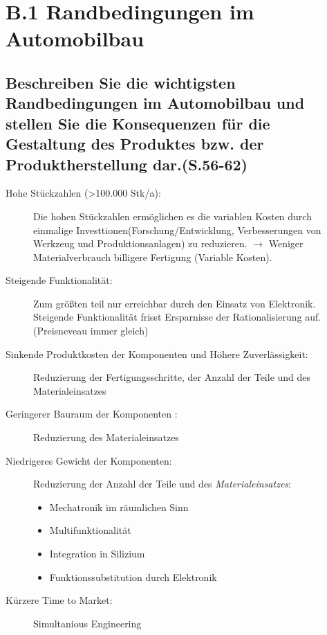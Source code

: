 \section*{B.1 Randbedingungen im Automobilbau}

\subsection{Beschreiben Sie die wichtigsten Randbedingungen im Automobilbau und stellen Sie die Konsequenzen f\"ur die Gestaltung des Produktes bzw. der Produktherstellung dar.(S.56-62)}
\begin{description}
  \item[Hohe Stückzahlen (\textgreater 100.000 Stk/a):]
    Die hohen Stückzahlen ermöglichen es die variablen Kosten durch
    einmalige Investtionen(Forschung/Entwicklung, Verbesserungen von
    Werkzeug und Produktionsanlagen) zu reduzieren. $\rightarrow$
    Weniger Materialverbrauch billigere Fertigung (Variable Kosten).
  \item[Steigende Funktionalität:]
    Zum größten teil nur erreichbar durch den Einsatz von Elektronik.
    Steigende Funktionalität frisst Ersparnisse der Rationalisierung
    auf. (Preisneveau immer gleich)
  \item[Sinkende Produktkosten der Komponenten und Höhere Zuverlässigkeit:]
    Reduzierung der Fertigungsschritte, der Anzahl der Teile und des Materialeinsatzes
  \item[Geringerer Bauraum der Komponenten :]
    Reduzierung des Materialeinsatzes
  \item[Niedrigeres Gewicht der Komponenten:]
    Reduzierung der Anzahl der Teile und des \emph{Materialeinsatzes}:

    \begin{itemize}
    \item Mechatronik im räumlichen Sinn
    \item Multifunktionalität
    \item Integration in Silizium
    \item Funktionssubstitution durch Elektronik
    \end{itemize}

    
  \item[Kürzere Time to Market:]
    Simultanious Engineering
\end{description}
